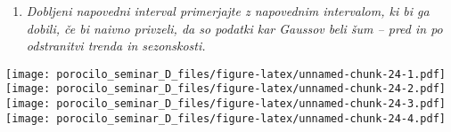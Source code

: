 \documentclass[
]{article}
\providecommand{\tightlist}{%
  \setlength{\itemsep}{0pt}\setlength{\parskip}{0pt}}
\begin{document}
\begin{enumerate}
\def\labelenumi{\arabic{enumi}.}
\setcounter{enumi}{8}
\tightlist
\item
  \emph{Dobljeni napovedni interval primerjajte z napovednim intervalom,
  ki bi ga dobili, če bi naivno privzeli, da so podatki kar Gaussov beli
  šum -- pred in po odstranitvi trenda in sezonskosti.}
\end{enumerate}

\texttt{[image: porocilo\_seminar\_D\_files/figure-latex/unnamed-chunk-24-1.pdf]}
\texttt{[image: porocilo\_seminar\_D\_files/figure-latex/unnamed-chunk-24-2.pdf]}
\texttt{[image: porocilo\_seminar\_D\_files/figure-latex/unnamed-chunk-24-3.pdf]}
\texttt{[image: porocilo\_seminar\_D\_files/figure-latex/unnamed-chunk-24-4.pdf]}
\end{document}
